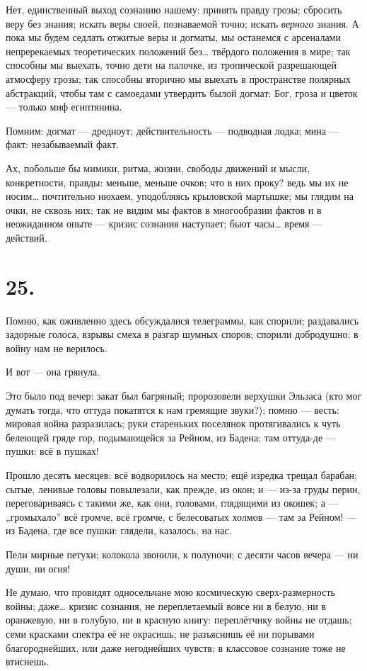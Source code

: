 \documentclass[12pt,a4paper,oneside]{book}
\begin{document}
Нет, единственный выход сознанию нашему: принять правду грозы; сбросить веру без знания; искать веры своей, познаваемой точно; искать \emph{верного} знания. А пока мы будем седлать отжитые веры и догматы, мы останемся с арсеналами непререкаемых теоретических положений без… твёрдого положения в мире; так способны мы выехать, точно дети на палочке, из тропической разрешающей атмосферу грозы; так способны вторично мы выехать в пространстве полярных абстракций, чтобы там с самоедами утвердить былой догмат: Бог, гроза и цветок — только миф египтянина.

Помним: догмат — дредноут; действительность — подводная лодка; мина — факт: незабываемый факт.

Ах, побольше бы мимики, ритма, жизни, свободы движений и мысли, конкретности, правды: меньше, меньше очков; что в них проку? ведь мы их не носим… почтительно нюхаем, уподобляясь крыловской мартышке; мы глядим на очки, не сквозь них; так не видим мы фактов в многообразии фактов и в неожиданном опыте — кризис сознания наступает; бьют часы… время — действий.

\section*{25.}

Помню, как оживленно здесь обсуждалися телеграммы, как спорили; раздавались задорные голоса, взрывы смеха в разгар шумных споров; спорили добродушно: в войну нам не верилось.

И вот — она грянула.

Это было под вечер: закат был багряный; пророзовели верхушки Эльзаса (кто мог думать тогда, что оттуда покатятся к нам гремящие звуки?); помню — весть: мировая война разразилась; руки стареньких поселянок протягивались к чуть белеющей гряде гор, подымающейся за Рейном, из Бадена; там оттуда-де — пушки: всё в пушках!

Прошло десять месяцев: всё водворилось на место; ещё изредка трещал барабан; сытые, ленивые головы повылезали, как прежде, из окон; и — из-за груды перин, переговариваясь с такими же, как они, головами, глядящими из окошек; а — „громыхало” всё громче, всё громче, с белесоватых холмов — там за Рейном! — из Бадена, где все пушки: глядели, казалось, на нас.

Пели мирные петухи; колокола звонили, к полуночи; с десяти часов вечера — ни души, ни огня!

Не думаю, что провидят односельчане мою космическую сверх-размерность войны; даже… кризис сознания, не переплетаемый вовсе ни в белую, ни в оранжевую, ни в голубую, ни в красную книгу: переплётчику войны не отдашь; семи красками спектра её не окрасишь; не разъяснишь её ни порывами благороднейших, или даже негоднейших чувств; в классовое сознание тоже не втиснешь.
\end{document}
